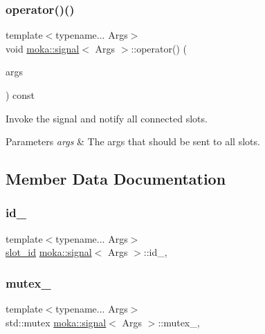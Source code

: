 \subsubsection{\texorpdfstring{operator()()}{operator()()}}
{\footnotesize\ttfamily template$<$typename... Args$>$ \\
void \mbox{\hyperlink{classmoka_1_1signal}{moka\+::signal}}$<$ Args $>$\+::operator() (\begin{DoxyParamCaption}\item[{const Args \&...}]{args }\end{DoxyParamCaption}) const}



Invoke the signal and notify all connected slots. 


\begin{DoxyParams}{Parameters}
{\em args} & The args that should be sent to all slots. \\
\hline
\end{DoxyParams}


\subsection{Member Data Documentation}
\mbox{\label{classmoka_1_1signal_ab8da1469fee78f6b05bf414685f42912}} 
\subsubsection{\texorpdfstring{id\_}{id\_}}
{\footnotesize\ttfamily template$<$typename... Args$>$ \\
\mbox{\hyperlink{namespacemoka_a959d3112313fb589684e8b1e3df66385}{slot\+\_\+id}} \mbox{\hyperlink{classmoka_1_1signal}{moka\+::signal}}$<$ Args $>$\+::id\+\_\+\hspace{0.3cm}{\ttfamily [mutable]}, {\ttfamily [protected]}}

\mbox{\label{classmoka_1_1signal_ab7a1d48d55a437002b8e7e6cd50c3ea7}} 
\subsubsection{\texorpdfstring{mutex\_}{mutex\_}}
{\footnotesize\ttfamily template$<$typename... Args$>$ \\
std\+::mutex \mbox{\hyperlink{classmoka_1_1signal}{moka\+::signal}}$<$ Args $>$\+::mutex\+\_\+\hspace{0.3cm}{\ttfamily [mutable]}, {\ttfamily [protected]}}

